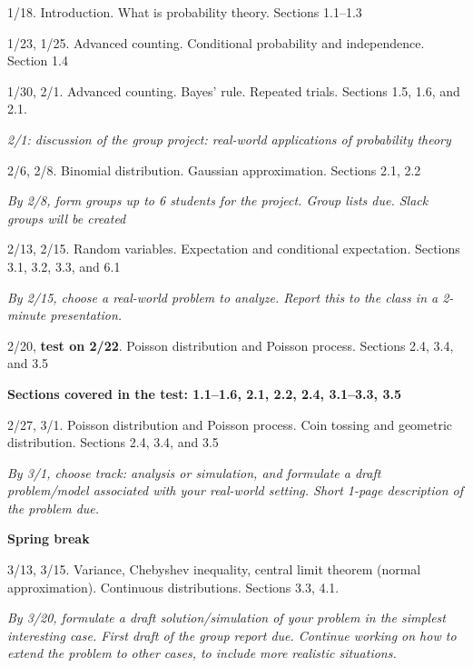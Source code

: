 \documentclass[oneside,11pt]{amsart}
\begin{document}
\begin{enumerate}[\bf{}{[}week 1{]}]
	\item 1/18. Introduction. What is probability theory. Sections 1.1--1.3

	\item 1/23, 1/25. Advanced counting. Conditional probability and independence. Section 1.4

	\item 1/30, 2/1. Advanced counting. Bayes' rule. Repeated trials. Sections 1.5, 1.6, and 2.1.

		\emph{2/1: discussion of the group project: real-world applications of probability theory}
		
	\item 2/6, 2/8. Binomial distribution. Gaussian approximation. Sections 2.1, 2.2

		\emph{By 2/8, form groups up to 6 students for the project. Group lists due. Slack groups will be created}

	\item 2/13, 2/15. Random variables. Expectation and conditional expectation. Sections 3.1, 3.2, 3.3, and 6.1

		\emph{By 2/15, choose a real-world problem to analyze. Report this to the class in a 2-minute presentation.}

	\item 2/20, \textbf{test on 2/22}. Poisson distribution and Poisson process. Sections 2.4, 3.4, and 3.5

		\textbf{Sections covered in the test: 1.1--1.6, 2.1, 2.2, 2.4, 3.1--3.3, 3.5}

	\item 2/27, 3/1. Poisson distribution and Poisson process. Coin tossing and geometric distribution. 
		Sections 2.4, 3.4, and 3.5
		
		\emph{By 3/1, choose track: analysis or simulation, and formulate a draft problem/model 
		associated with your real-world setting.
		Short 1-page description of the problem due.}

		\textbf{Spring break}

	\item 3/13, 3/15. 
		Variance, Chebyshev inequality, central limit theorem (normal approximation).
		Continuous distributions.
		Sections 3.3, 4.1.

		\emph{By 3/20, formulate a draft solution/simulation of your problem in the
		simplest interesting case. 
		First draft of the group report due.
		Continue working on how to extend the problem to other cases, to include more realistic situations.}


\end{enumerate}
\end{document}
